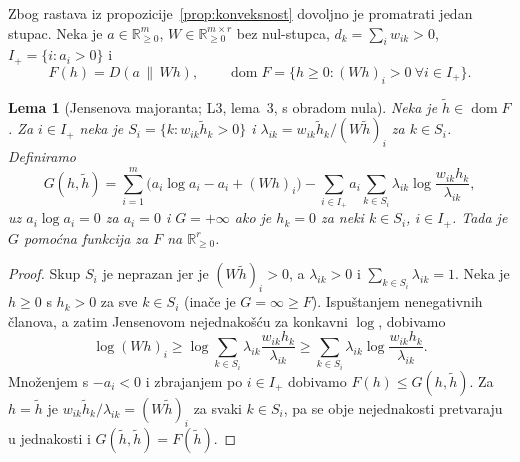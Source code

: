 \documentclass[11pt,a4paper]{article}
\theoremstyle{definition}
\theoremstyle{plain}
\newtheorem{lema}[definicija]{Lema}
\theoremstyle{remark}
\newcommand{\Rp}{\mathbb{R}_{\geq 0}}
\newcommand{\Dkl}[2]{D(#1\,\|\,#2)}
\DeclareMathOperator{\dom}{dom}
\begin{document}
Zbog rastava iz propozicije~\ref{prop:konveksnost} dovoljno je promatrati jedan stupac. Neka je
$a\in\Rp^m$, $W\in\Rp^{m\times r}$ bez nul-stupca, $d_k=\sum_iw_{ik}>0$, $I_+=\{i:a_i>0\}$ i
\[
  F(h)=\Dkl{a}{Wh},\qquad \dom F=\{h\geq0:(Wh)_i>0\ \forall i\in I_+\}.
\]

\begin{lema}[Jensenova majoranta; L3, lema~3, s obradom nula]\label{lm:majoranta}
Neka je $\tilde h\in\dom F$. Za $i\in I_+$ neka je $S_i=\{k:w_{ik}\tilde h_k>0\}$ i
$\lambda_{ik}=w_{ik}\tilde h_k/(W\tilde h)_i$ za $k\in S_i$. Definiramo
\[
  G(h,\tilde h)=\sum_{i=1}^m\bigl(a_i\log a_i-a_i+(Wh)_i\bigr)
  -\sum_{i\in I_+}a_i\sum_{k\in S_i}\lambda_{ik}\log\frac{w_{ik}h_k}{\lambda_{ik}},
\]
uz $a_i\log a_i=0$ za $a_i=0$ i $G=+\infty$ ako je $h_k=0$ za neki $k\in S_i$, $i\in I_+$. Tada je $G$
pomoćna funkcija za $F$ na $\Rp^r$.
\end{lema}
\begin{proof}
Skup $S_i$ je neprazan jer je $(W\tilde h)_i>0$, a $\lambda_{ik}>0$ i $\sum_{k\in S_i}\lambda_{ik}=1$.
Neka je $h\geq0$ s $h_k>0$ za sve $k\in S_i$ (inače je $G=\infty\geq F$). Ispuštanjem nenegativnih
članova, a zatim Jensenovom nejednakošću za konkavni $\log$, dobivamo
\[
  \log(Wh)_i\geq\log\sum_{k\in S_i}\lambda_{ik}\frac{w_{ik}h_k}{\lambda_{ik}}
  \geq\sum_{k\in S_i}\lambda_{ik}\log\frac{w_{ik}h_k}{\lambda_{ik}}.
\]
Množenjem s $-a_i<0$ i zbrajanjem po $i\in I_+$ dobivamo $F(h)\leq G(h,\tilde h)$. Za $h=\tilde h$ je
$w_{ik}\tilde h_k/\lambda_{ik}=(W\tilde h)_i$ za svaki $k\in S_i$, pa se obje nejednakosti pretvaraju
u jednakosti i $G(\tilde h,\tilde h)=F(\tilde h)$.
\end{proof}
\end{document}
